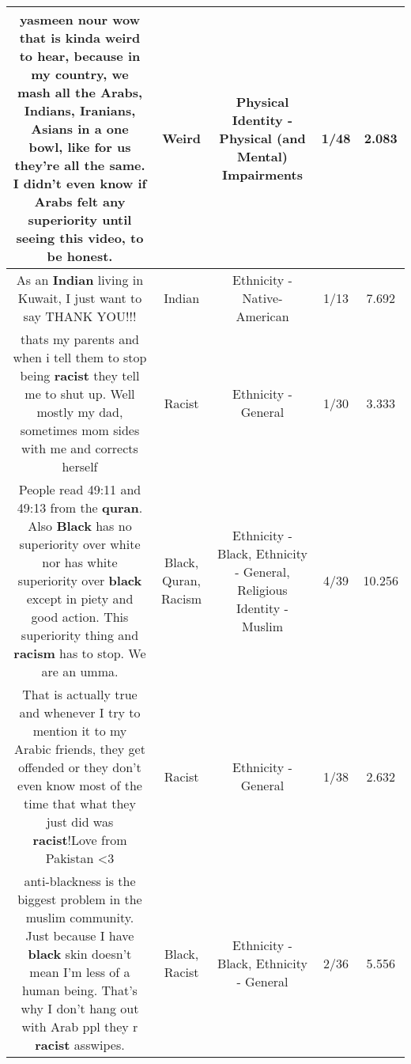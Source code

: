 \documentclass[11pt]{article}
\newlength\mylength
\begin{document}
\begin{center}
\begin{longtable}{|C{.65\mylength}|C{.30\mylength}|C{.12\mylength}|C{.12\mylength}|C{.12\mylength}|}
  \small yasmeen nour wow that is kinda \textbf{weird} to hear, because in my country, we mash all the Arabs, Indians, Iranians, Asians in a one bowl, like for us they're all the same. I didn't even know if Arabs felt any superiority until seeing this video, to be honest.\normalsize   & Weird & Physical Identity - Physical (and Mental) Impairments & 1/48 & 2.083 \\  \hline
  \small As an \textbf{Indian} living in Kuwait, I just want to say THANK YOU!!!\normalsize   & Indian & Ethnicity - Native-American & 1/13 & 7.692 \\  \hline
  \small thats my parents and when i tell them to stop being \textbf{racist} they tell me to  shut up. Well mostly my dad, sometimes mom sides with me and corrects herself\normalsize   & Racist & Ethnicity - General & 1/30 & 3.333 \\  \hline
  \small People read 49:11 and 49:13 from the \textbf{quran}. Also \textbf{Black} has no superiority over white nor has white superiority over \textbf{black} except in piety and good action. This superiority thing and \textbf{racism} has to stop. We are an umma.\normalsize   & Black, Quran, Racism & Ethnicity - Black, Ethnicity - General, Religious Identity - Muslim & 4/39 & 10.256 \\  \hline
  \small That is actually true and whenever I try to mention it to my Arabic friends, they get offended or they don't even know most of the time that what they just did was \textbf{racist}!Love from Pakistan <3\normalsize   & Racist & Ethnicity - General & 1/38 & 2.632 \\  \hline
  \small anti-blackness is the biggest problem in the muslim community. Just because I have \textbf{black} skin doesn't mean I'm less of a human being. That's why I don't hang out with Arab ppl they r \textbf{racist} asswipes.\normalsize   & Black, Racist & Ethnicity - Black, Ethnicity - General & 2/36 & 5.556 \\  \hline

\end{longtable}
\end{center}
\end{document}
